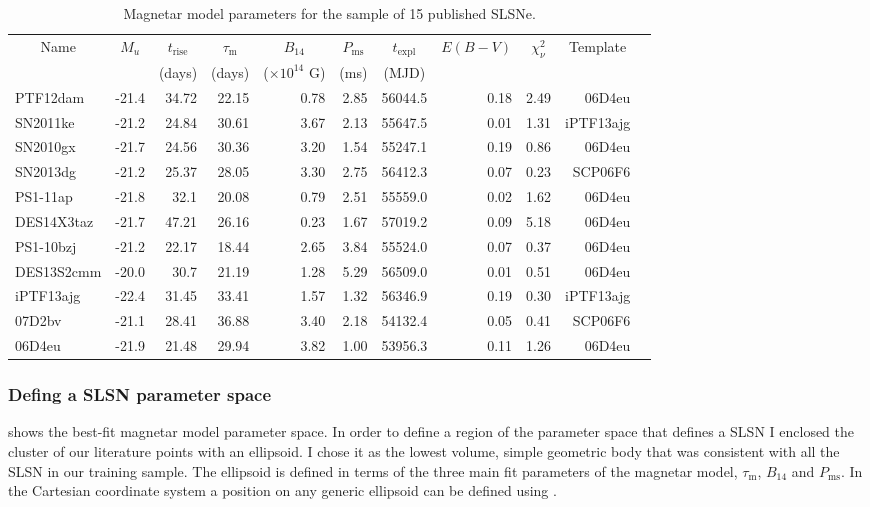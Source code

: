 \begin{table}
\begin{center}
\caption{Magnetar model parameters for the sample of 15 published SLSNe.}
\label{table:Magnetar}
\begin{tabular}{|l|r|r|r|r|r|r|r|r|r|r|}
\hline
  \multicolumn{1}{|c|}{Name} &
  \multicolumn{1}{c|}{$M_u$} &
  \multicolumn{1}{c|}{$t_\mathrm{rise}$} &
  \multicolumn{1}{c|}{$\tau_\mathrm{m}$} &
  \multicolumn{1}{c|}{$B_{14}$} &
  \multicolumn{1}{c|}{$P_{\mathrm{ms}}$} &
  \multicolumn{1}{c|}{$t_\mathrm{expl}$} &
  \multicolumn{1}{c|}{$E(B-V)$} &
  \multicolumn{1}{c|}{$\chi^2_{\nu}$} &
  \multicolumn{1}{c|}{Template} \\ & &
  \multicolumn{1}{c|}{(days)} &
  \multicolumn{1}{c|}{(days)} &
  \multicolumn{1}{c|}{($\times10^{14}$ G)} &
  \multicolumn{1}{c|}{(ms)} &
  \multicolumn{1}{c|}{(MJD)} & \\
\hline
  PTF12dam & -21.4 & 34.72 & 22.15 & 0.78 & 2.85 & 56044.5 & 0.18 & 2.49 & 06D4eu\\
  SN2011ke & -21.2 & 24.84 & 30.61 & 3.67 & 2.13 & 55647.5 & 0.01 & 1.31 & iPTF13ajg\\
  SN2010gx & -21.7 & 24.56 & 30.36 & 3.20 & 1.54 & 55247.1 & 0.19 & 0.86 & 06D4eu\\
  SN2013dg & -21.2 & 25.37 & 28.05 & 3.30 & 2.75 & 56412.3 & 0.07 & 0.23 & SCP06F6\\
  PS1-11ap & -21.8 & 32.1 & 20.08 & 0.79 & 2.51 & 55559.0 & 0.02 & 1.62 & 06D4eu\\
  DES14X3taz & -21.7 & 47.21 & 26.16 & 0.23 & 1.67 & 57019.2 & 0.09 & 5.18 & 06D4eu\\
  PS1-10bzj & -21.2 & 22.17 & 18.44 & 2.65 & 3.84 & 55524.0 & 0.07 & 0.37 & 06D4eu\\
  DES13S2cmm & -20.0 & 30.7 & 21.19 & 1.28 & 5.29 & 56509.0 & 0.01 & 0.51 & 06D4eu\\
  iPTF13ajg & -22.4 & 31.45 & 33.41 & 1.57 & 1.32 & 56346.9 & 0.19 & 0.30 & iPTF13ajg\\
  07D2bv & -21.1 & 28.41 & 36.88 & 3.40 & 2.18 & 54132.4 & 0.05 & 0.41 & SCP06F6\\
  06D4eu & -21.9 & 21.48 & 29.94 & 3.82 & 1.00 & 53956.3 & 0.11 & 1.26 & 06D4eu\\
\hline\end{tabular}
\end{center}
\end{table}

\subsubsection{Defing a SLSN parameter space}
 shows the best-fit magnetar model parameter space. In order to define a region of the parameter space that defines a SLSN I enclosed the cluster of our literature points with an ellipsoid. I chose it as the lowest volume, simple geometric body that was consistent with all the SLSN in our training sample. The ellipsoid is defined in terms of the three main fit parameters of the magnetar model, $\tau_\mathrm{m}$, $B_{14}$ and $P_{\mathrm{ms}}$. In the Cartesian coordinate system a position on any generic ellipsoid can be defined using .

